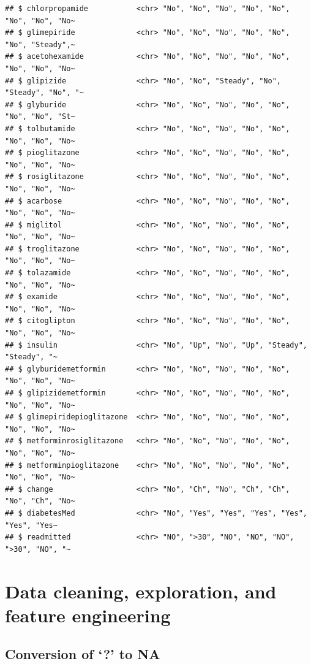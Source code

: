 \documentclass[
]{article}
\begin{document}
\begin{verbatim}
## $ chlorpropamide           <chr> "No", "No", "No", "No", "No", "No", "No", "No~
## $ glimepiride              <chr> "No", "No", "No", "No", "No", "No", "Steady",~
## $ acetohexamide            <chr> "No", "No", "No", "No", "No", "No", "No", "No~
## $ glipizide                <chr> "No", "No", "Steady", "No", "Steady", "No", "~
## $ glyburide                <chr> "No", "No", "No", "No", "No", "No", "No", "St~
## $ tolbutamide              <chr> "No", "No", "No", "No", "No", "No", "No", "No~
## $ pioglitazone             <chr> "No", "No", "No", "No", "No", "No", "No", "No~
## $ rosiglitazone            <chr> "No", "No", "No", "No", "No", "No", "No", "No~
## $ acarbose                 <chr> "No", "No", "No", "No", "No", "No", "No", "No~
## $ miglitol                 <chr> "No", "No", "No", "No", "No", "No", "No", "No~
## $ troglitazone             <chr> "No", "No", "No", "No", "No", "No", "No", "No~
## $ tolazamide               <chr> "No", "No", "No", "No", "No", "No", "No", "No~
## $ examide                  <chr> "No", "No", "No", "No", "No", "No", "No", "No~
## $ citoglipton              <chr> "No", "No", "No", "No", "No", "No", "No", "No~
## $ insulin                  <chr> "No", "Up", "No", "Up", "Steady", "Steady", "~
## $ glyburidemetformin       <chr> "No", "No", "No", "No", "No", "No", "No", "No~
## $ glipizidemetformin       <chr> "No", "No", "No", "No", "No", "No", "No", "No~
## $ glimepiridepioglitazone  <chr> "No", "No", "No", "No", "No", "No", "No", "No~
## $ metforminrosiglitazone   <chr> "No", "No", "No", "No", "No", "No", "No", "No~
## $ metforminpioglitazone    <chr> "No", "No", "No", "No", "No", "No", "No", "No~
## $ change                   <chr> "No", "Ch", "No", "Ch", "Ch", "No", "Ch", "No~
## $ diabetesMed              <chr> "No", "Yes", "Yes", "Yes", "Yes", "Yes", "Yes~
## $ readmitted               <chr> "NO", ">30", "NO", "NO", "NO", ">30", "NO", "~
\end{verbatim}

\hypertarget{data-cleaning-exploration-and-feature-engineering}{%
\section{Data cleaning, exploration, and feature
engineering}\label{data-cleaning-exploration-and-feature-engineering}}

\hypertarget{conversion-of-to-na}{%
\subsection{Conversion of `?' to NA}\label{conversion-of-to-na}}
\end{document}

